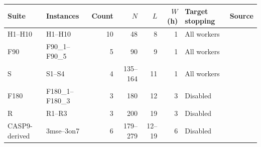 \begin{tabular}{@{}llrrrrll@{}}
\toprule
Suite & Instances & Count & $N$ & $L$ & $W$ (h) & Target stopping & Source \\
\midrule
H1--H10 & H1--H10 & 10 & 48 & 8 & 1 & All workers & \cite{doduc2018,dotu2011} \\
F90 & F90\_1--F90\_5 & 5 & 90 & 9 & 1 & All workers & \cite{liu2013elp,liu2014iwl} \\
S & S1--S4 & 4 & 135--164 & 11 & 1 & All workers & \cite{liu2013elp,liu2014iwl} \\
F180 & F180\_1--F180\_3 & 3 & 180 & 12 & 3 & Disabled & \cite{liu2013elp,liu2014iwl} \\
R & R1--R3 & 3 & 200 & 19 & 3 & Disabled & \cite{liu2013elp,liu2014iwl} \\
CASP9-derived & 3mse--3on7 & 6 & 179--279 & 12--19 & 6 & Disabled & \cite{liu2013elp,liu2014iwl} \\
\bottomrule
\end{tabular}
